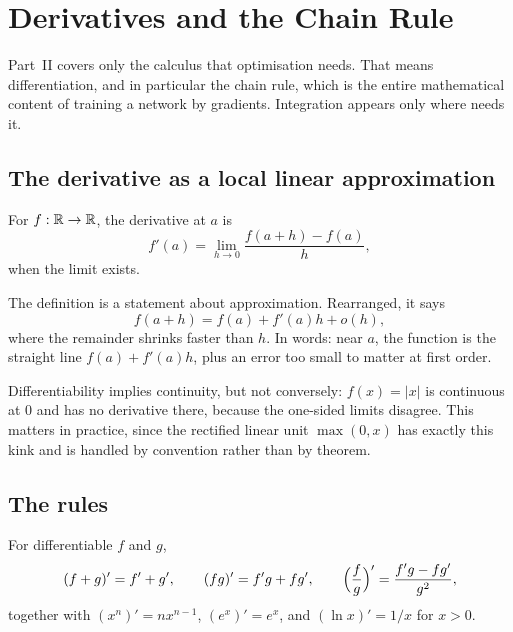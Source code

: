 \setchapterpreamble[u]{\margintoc}
\chapter{Derivatives and the Chain Rule}


Part~II covers only the calculus that optimisation needs. That means
differentiation, and in particular the chain rule, which is the entire
mathematical content of training a network by gradients. Integration appears
only where  needs it.

\section{The derivative as a local linear approximation}

\begin{definition}
For \(f:\mathbb{R}\to\mathbb{R}\), the derivative at \(a\) is
\[
	f'(a)=\lim_{h\to0}\frac{f(a+h)-f(a)}{h},
\]
when the limit exists.
\end{definition}

The definition is a statement about approximation. Rearranged, it says
\[
	f(a+h)=f(a)+f'(a)h+o(h),
\]
where the remainder shrinks faster than \(h\). In words: near \(a\), the function
is the straight line \(f(a)+f'(a)h\), plus an error too small to matter at first
order.


Differentiability implies continuity, but not conversely: \(f(x)=|x|\) is
continuous at \(0\) and has no derivative there, because the one-sided limits
disagree. This matters in practice, since the rectified linear unit
\(\max(0,x)\) has exactly this kink and is handled by convention rather than by
theorem.

\section{The rules}

For differentiable \(f\) and \(g\),
\[
	(f+g)'=f'+g',
	\qquad
	(fg)'=f'g+fg',
	\qquad
	\Bigl(\frac{f}{g}\Bigr)'=\frac{f'g-fg'}{g^{2}},
\]
together with \((x^{n})'=nx^{n-1}\), \((e^{x})'=e^{x}\), and
\((\ln x)'=1/x\) for \(x>0\).

